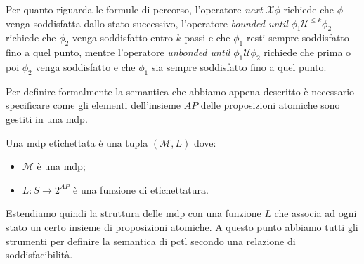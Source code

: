 Per quanto riguarda le formule di percorso, l'operatore \emph{next} $\mathcal{X}\phi$ richiede che $\phi$ venga soddisfatta dallo stato successivo, l'operatore \emph{bounded until} $\phi_1 \mathcal{U}^{\leq k} \phi_2$ richiede che $\phi_2$ venga soddisfatto entro $k$ passi e che $\phi_1$ resti sempre soddisfatto fino a quel punto, mentre l'operatore \emph{unbonded until} $\phi_1 \mathcal{U} \phi_2$ richiede che prima o poi $\phi_2$ venga soddisfatto e che $\phi_1$ sia sempre soddisfatto fino a quel punto.

Per definire formalmente la semantica che abbiamo appena descritto è necessario specificare come gli elementi dell'insieme $AP$ delle proposizioni atomiche sono gestiti in una \ac{mdp}.
\begin{mtdef}
	Una \ac{mdp} etichettata è una tupla $(\mathcal{M},L)$ dove:
	\begin{itemize}
		\item $\mathcal{M}$ è una \ac{mdp};
		\item $L:S\rightarrow 2^{AP}$ è una funzione di etichettatura.
	\end{itemize}
\end{mtdef}
Estendiamo quindi la struttura delle \ac{mdp} con una funzione $L$ che associa ad ogni stato un certo insieme di proposizioni atomiche. A questo punto abbiamo tutti gli strumenti per definire la semantica di \ac{pctl} secondo una relazione di soddisfacibilità.
